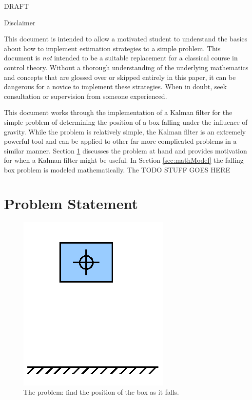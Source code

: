 \documentclass{article}
\begin{document}
\maketitle

\begin{center}
\Huge 
DRAFT
\normalsize
\end{center}
\vspace{4cm}

Disclaimer

This document is intended to allow a motivated student to understand the basics about how to implement estimation strategies to a simple problem.  This document is \emph{not} intended to be a suitable replacement for a classical course in control theory.  Without a thorough understanding of the underlying mathematics and concepts that are glossed over or skipped entirely in this paper, it can be dangerous for a novice to implement these strategies.  When in doubt, seek consultation or supervision from someone experienced.

\newpage

This document works through the implementation of a Kalman filter for the simple problem of determining the position of a box falling under the influence of gravity.  While the problem is relatively simple, the Kalman filter is an extremely powerful tool and can be applied to other far more complicated problems in a similar manner.  Section \ref{sec:probStatement} discusses the problem at hand and provides motivation for when a Kalman filter might be useful.  In Section \ref{sec:mathModel} the falling box problem is modeled mathematically.  The TODO STUFF GOES HERE


\section{Problem Statement}
\label{sec:probStatement}

\begin{figure}[h]
\includegraphics[scale=0.25]{boxPicture.png}
\centering
\caption{The problem: find the position of the box as it falls.}
\label{fig:boxPic}
\end{figure}
\end{document}
